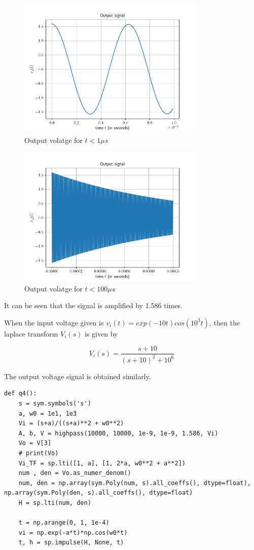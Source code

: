 \documentclass[12pt, a4paper]{article}
\begin{document}
\begin{figure}[H]
\centering
\includegraphics[width=0.8\textwidth]{q4Output1.png}
\caption{Output volatge for $t < 1 \mu s$}
\end{figure}

\begin{figure}[H]
\centering
\includegraphics[width=0.8\textwidth]{q4Output2.png}
\caption{Output volatge for $t < 100 \mu s$}
\end{figure}

It can be seen that the signal is amplified by 1.586 times.

When the input voltage given is $v_i(t) = exp(-10 t)cos(10^3 t)$, then the laplace transform $V_i(s)$ is given by

\begin{equation*}
V_i(s) = \frac{s+10}{(s+10)^2 + 10^{6}}
\end{equation*}

The output voltage signal is obtained similarly. 

\begin{lstlisting}
def q4():
    s = sym.symbols('s')
    a, w0 = 1e1, 1e3
    Vi = (s+a)/((s+a)**2 + w0**2)
    A, b, V = highpass(10000, 10000, 1e-9, 1e-9, 1.586, Vi)
    Vo = V[3]
    # print(Vo)
    Vi_TF = sp.lti([1, a], [1, 2*a, w0**2 + a**2])
    num , den = Vo.as_numer_denom()
    num, den = np.array(sym.Poly(num, s).all_coeffs(), dtype=float), np.array(sym.Poly(den, s).all_coeffs(), dtype=float)
    H = sp.lti(num, den)

    t = np.arange(0, 1, 1e-4)
    vi = np.exp(-a*t)*np.cos(w0*t)
    t, h = sp.impulse(H, None, t)
\end{lstlisting}
\end{document}
